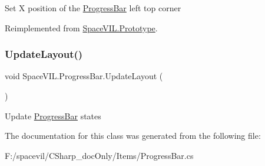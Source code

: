 Set X position of the \mbox{\hyperlink{class_space_v_i_l_1_1_progress_bar}{Progress\+Bar}} left top corner 



Reimplemented from \mbox{\hyperlink{class_space_v_i_l_1_1_prototype}{Space\+V\+I\+L.\+Prototype}}.

\mbox{\label{class_space_v_i_l_1_1_progress_bar_a210b9b1fb096d851fcbc1aa34872f389}} 
\subsubsection{\texorpdfstring{Update\+Layout()}{UpdateLayout()}}
{\footnotesize\ttfamily void Space\+V\+I\+L.\+Progress\+Bar.\+Update\+Layout (\begin{DoxyParamCaption}{ }\end{DoxyParamCaption})}



Update \mbox{\hyperlink{class_space_v_i_l_1_1_progress_bar}{Progress\+Bar}} states 



The documentation for this class was generated from the following file\+:\begin{DoxyCompactItemize}
\item 
F\+:/spacevil/\+C\+Sharp\+\_\+doc\+Only/\+Items/Progress\+Bar.\+cs\end{DoxyCompactItemize}
